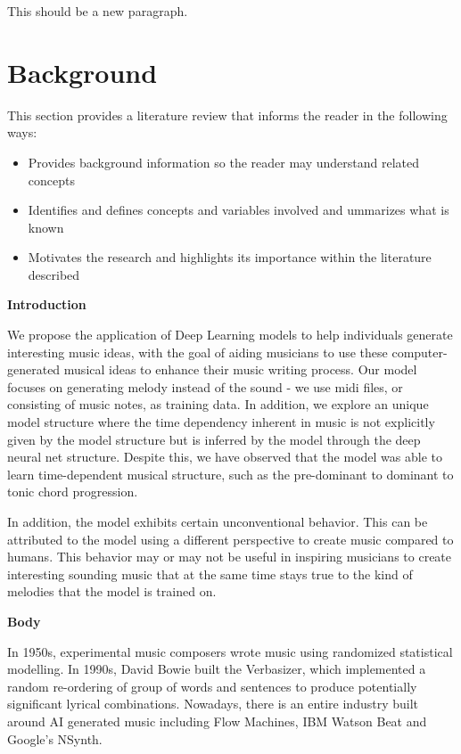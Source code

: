 \documentclass[12pt,oneside]{chicagocapstone}
\providecommand{\tightlist}{%
  \setlength{\itemsep}{0pt}\setlength{\parskip}{0pt}}
\begin{document}
This should be a new paragraph.

\hypertarget{background}{%
\chapter*{Background}\label{background}}

This section provides a literature review that informs the reader in the following ways:
\begin{itemize}
\tightlist
\item
  Provides background information so the reader may understand related concepts
\item
  Identifies and defines concepts and variables involved and ummarizes what is known
\item
  Motivates the research and highlights its importance within the literature described
\end{itemize}
\textbf{Introduction}

We propose the application of Deep Learning models to help individuals generate interesting music ideas, with the goal of aiding musicians to use these computer-generated musical ideas to enhance their music writing process. Our model focuses on generating melody instead of the sound - we use midi files, or consisting of music notes, as training data. In addition, we explore an unique model structure where the time dependency inherent in music is not explicitly given by the model structure but is inferred by the model through the deep neural net structure. Despite this, we have observed that the model was able to learn time-dependent musical structure, such as the pre-dominant to dominant to tonic chord progression.

In addition, the model exhibits certain unconventional behavior. This can be attributed to the model using a different perspective to create music compared to humans. This behavior may or may not be useful in inspiring musicians to create interesting sounding music that at the same time stays true to the kind of melodies that the model is trained on.

\textbf{Body}

In 1950s, experimental music composers wrote music using randomized statistical modelling. In 1990s, David Bowie built the Verbasizer, which implemented a random re-ordering of group of words and sentences to produce potentially significant lyrical combinations. Nowadays, there is an entire industry built around AI generated music including Flow Machines, IBM Watson Beat and Google's NSynth.
\end{document}
